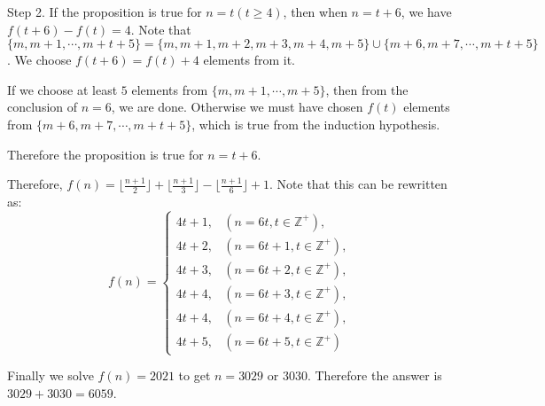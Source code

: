 \begin{solution}
Step 2. If the proposition is true for $n=t(t\geq4)$, then when $n=t+6$, we have $f(t+6)-f(t)=4$. Note that $\{m,m+1,\dotsb,m+t+5\}=\{m,m+1,m+2,m+3,m+4,m+5\}\cup\{m+6,m+7,\dotsb,m+t+5\}$. We choose $f(t+6)=f(t)+4$ elements from it.

If we choose at least $5$ elements from $\{m,m+1,\dotsb,m+5\}$, then from the conclusion of $n=6$, we are done. Otherwise we must have chosen $f(t)$ elements from $\{m+6,m+7,\dotsb,m+t+5\}$, which is true from the induction hypothesis.

Therefore the proposition is true for $n=t+6$.

Therefore, $f(n)=\lfloor\frac{n+1}2\rfloor+\lfloor\frac{n+1}3\rfloor-\lfloor\frac{n+1}6\rfloor+1$. Note that this can be rewritten as:
$$
f(n)=
\begin{cases}
4t+1,&(n=6t,t\in\mathbb{Z}^+),\\
4t+2,&(n=6t+1,t\in\mathbb{Z}^+),\\
4t+3,&(n=6t+2,t\in\mathbb{Z}^+),\\
4t+4,&(n=6t+3,t\in\mathbb{Z}^+),\\
4t+4,&(n=6t+4,t\in\mathbb{Z}^+),\\
4t+5,&(n=6t+5,t\in\mathbb{Z}^+)\end{cases}
$$

Finally we solve $f(n)=2021$ to get $n=3029$ or $3030$. Therefore the answer is $3029+3030=\boxed{6059}$.
\end{solution}\bigskip
